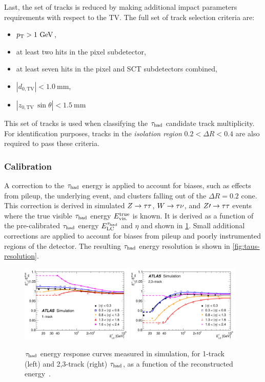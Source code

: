 Last, the set of tracks is reduced by making additional impact parameters requirements with respect to the TV. The full set of track selection criteria are:
%
\begin{itemize}
    \item $p_{\mathrm{T}} > 1~\mathrm{GeV}$,
    \item at least two hits in the pixel subdetector,
    \item at least seven hits in the pixel and SCT subdetectors combined,
    \item $|d_{0,\text{TV}}| < 1.0~\mathrm{mm}$,
    \item $|z_{0,\text{TV}} \, \sin{\theta}| < 1.5~\mathrm{mm}$
\end{itemize}
%
This set of tracks is used when classifying the $\tau_\text{had}$ candidate track multiplicity. For identification purposes, tracks in the \textit{isolation region} $0.2 < \Delta R < 0.4$ are also required to pass these criteria.

\subsubsection{Calibration}

A correction to the $\tau_\text{had}$ energy is applied to account for biases, such as effects from pileup, the underlying event, and clusters falling out of the $\Delta R = 0.2$ cone. This correction is derived in simulated $Z\rightarrow\tau\tau$, $W\rightarrow\tau\nu$, and $Z\prime\rightarrow\tau\tau$ events where the true visible $\tau_\text{had}$ energy $E_\text{vis.}^\text{true}$ is known. It is derived as a function of the pre-calibrated $\tau_\text{had}$ energy $E_\text{LC}^{\tau_\text{had}}$ and $\eta$ and shown in \cref{fig:taus-calibration}. Small additional corrections are applied to account for biases from pileup and poorly instrumented regions of the detector. The resulting $\tau_\text{had}$ energy resolution is shown in \cref{fig:taus-resolution}.

\begin{figure}[tp]
  \centering
  \includegraphics[width=0.48\textwidth]{figures/PERF-2013-06/fig_15a}
  \includegraphics[width=0.48\textwidth]{figures/PERF-2013-06/fig_15b}
  \caption{$\tau_\text{had}$ energy response curves measured in simulation, for 1-track (left) and 2,3-track (right) $\tau_\text{had}$, as a function of the reconstructed energy~\cite{PERF-2013-06}.}
  \label{fig:taus-calibration}
\end{figure}

